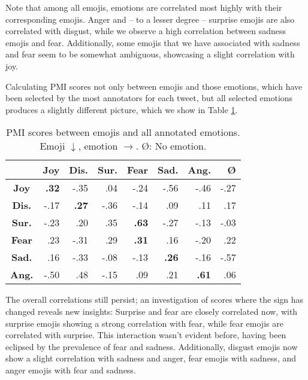 \documentclass[10pt, a4paper]{article}
\begin{document}
Note that among all emojis, emotions are correlated most highly with their corresponding emojis. Anger and -- to a lesser degree -- surprise emojis are also correlated with disgust, while we observe a high correlation between sadness emojis and fear. Additionally, some emojis that we have associated with sadness and fear seem to be somewhat ambiguous, showcasing a slight correlation with joy.

Calculating PMI scores not only between emojis and those emotions, which have been selected by the most annotators for each tweet, but all selected emotions produces a slightly different picture, which we show in Table \ref{tab:pmi_results_all_emotions}.

\begin{table}[!ht]
\centering
\begin{tabular}{c | r | r | r |%
%
%
 r | r | r | r}
 & \textbf{Joy} & \textbf{Dis.} & \textbf{Sur.} & \textbf{Fear} & \textbf{Sad.} & \textbf{Ang.} & \textbf{\O} \\\hline
\textbf{Joy} & \textbf{.32} & -.35 & .04 & -.24 & -.56 & -.46 & -.27 \\
\textbf{Dis.} & -.17 & \textbf{.27} & -.36 & -.14 & .09 & .11 & .17 \\
\textbf{Sur.} & -.23 & .20 & .35 & \textbf{.63} & -.27 & -.13 & -.03 \\
\textbf{Fear} & .23 & -.31 & .29 & \textbf{.31} & .16 & -.20 & .22 \\
\textbf{Sad.} & .16 & -.33 & -.08 & -.13 & \textbf{.26} & -.16 & -.57 \\
\textbf{Ang.} & -.50 & .48 & -.15 & .09 & .21 & \textbf{.61} & .06
\end{tabular}
\caption{PMI scores between emojis and all annotated emotions. Emoji $\downarrow$, emotion $\rightarrow$. \O: No emotion.}
\label{tab:pmi_results_all_emotions}
\end{table}

The overall correlations still persist; an investigation of scores where the sign has changed reveals new insights: Surprise and fear are closely correlated now, with surprise emojis showing a strong correlation with fear, while fear emojis are correlated with surprise. This interaction wasn't evident before, having been eclipsed by the prevalence of fear and sadness. Additionally, disgust emojis now show a slight correlation with sadness and anger, fear emojis with sadness, and anger emojis with fear and sadness.
\end{document}
